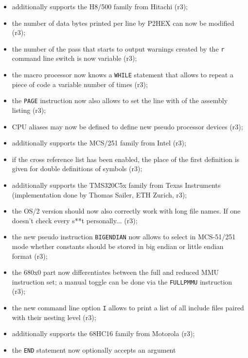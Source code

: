 \documentclass[12pt,twoside]{report}
\newcommand{\tty}[1]{{\tt #1}}
\begin{document}
\begin{itemize}
{\begin{itemize}
{            (r2);}
      \item{additionally supports the H8/500 family from Hitachi
            (r3);}
      \item{the number of data bytes printed per line by P2HEX
            can now be modified (r3);}
      \item{the number of the pass that starts to output warnings
            created by the \tty{r} command line switch is now variable
            (r3);}
      \item{the macro processor now knows a \tty{WHILE} statement that
            allows to repeat a piece of code a variable number of
            times (r3);}
      \item{the \tty{PAGE} instruction now also allows to set the line
            with of the assembly listing (r3);}
      \item{CPU aliases may now be defined to define new pseudo
            processor devices (r3);}
      \item{additionally supports the MCS/251 family from Intel
            (r3);}
      \item{if the cross reference list has been enabled, the
            place of the first definition is given for double
            definitions of symbols (r3);}
      \item{additionally supports the TMS320C5x family from Texas
            Instruments (implementation done by Thomas Sailer,
            ETH Zurich, r3);}
      \item{the OS/2 version should now also correctly work with
            long file names.  If one doesn't check every s**t
            personally... (r3);}
      \item{the new pseudo instruction \tty{BIGENDIAN} now allows to
            select in MCS-51/251 mode whether constants should
            be stored in big endian or little endian format (r3);}
      \item{the 680x0 part now differentiates between the full
            and reduced MMU instruction set; a manual toggle can
            be done via the \tty{FULLPMMU} instruction (r3);}
      \item{the new command line option \tty{I} allows to print a list
            of all include files paired with their nesting level
            (r3);}
      \item{additionally supports the 68HC16 family from Motorola
            (r3);}
      \item{the \tty{END} statement now optionally accepts an argument
}
\end{itemize}}
\end{itemize}
\end{document}
